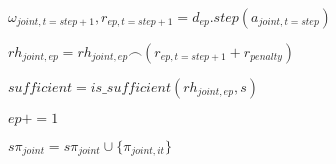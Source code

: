 \begin{algorithm}[hbt!]
{{{                

                $\omega_{joint,t=step+1}, r_{ep,t=step+1} = d_{ep}.step(a_{joint,t=step})$


                $rh_{joint,ep} = rh_{joint,ep} \frown (r_{ep,t=step+1} + r_{ penalty})$

            }

            $sufficient = is\_sufficient(rh_{joint,ep}, s)$
    
            $ep += 1$
        }

        $s\pi_{joint} = s\pi_{joint} \cup \{\pi_{joint,it}\}$

    }

\end{algorithm}